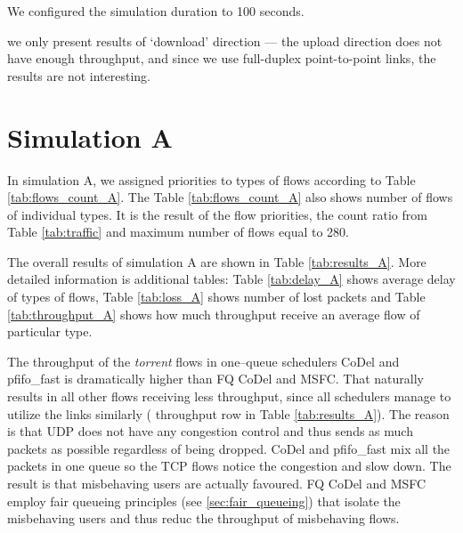  We configured the simulation duration to 100 seconds.

 we only present results of `download'  direction --- the upload direction does not have enough throughput, and since we use full-duplex  point-to-point links, the results are not interesting. 



\section{Simulation A}
 
%






In simulation A, we assigned priorities to types of flows according to Table \ref{tab:flows_count_A}. The Table \ref{tab:flows_count_A} also shows number of flows of individual types. It is the result of the flow priorities, the count ratio from Table \ref{tab:traffic} and maximum number of flows equal to 280.  

The overall results of simulation A are shown in Table \ref{tab:results_A}. More detailed information is additional tables: Table \ref{tab:delay_A} shows average delay of types of flows, Table \ref{tab:loss_A} shows number of lost packets and Table \ref{tab:throughput_A} shows how much throughput receive an average flow of particular type.

 The throughput of the \emph{torrent} flows in one--queue schedulers CoDel and pfifo\_fast is dramatically higher than FQ CoDel and MSFC. That naturally results in all other flows receiving less throughput, since all schedulers manage to utilize the links similarly ( throughput row in Table \ref{tab:results_A}). The reason is\XX{,} that UDP does not have any congestion control and thus sends as much packets as possible regardless of being dropped. CoDel and pfifo\_fast mix all the packets in one queue so the TCP flows notice the congestion and slow down. The result is\XX{,} that misbehaving users are actually favoured. FQ CoDel and MSFC employ fair queueing principles (see \autoref{sec:fair_queueing}) that isolate the misbehaving users and thus reduc the throughput of misbehaving flows. 

